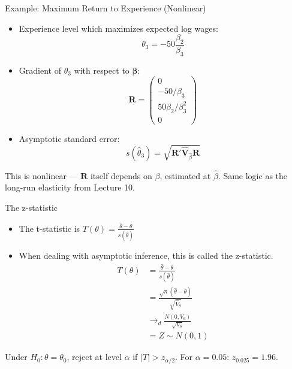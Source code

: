 \documentclass[aspectratio=169, handout, t]{beamer}
\numberwithin{equation}{section}
\begin{document}
\begin{frame}{Example: Maximum Return to Experience (Nonlinear)}
\begin{itemize}
\item Experience level which maximizes expected log wages:
\[
\theta_3 = -50\frac{\beta_2}{\beta_3}
\]
\item Gradient of $\theta_3$ with respect to $\bm{\beta}$:
\[
\bm{R} =
\begin{pmatrix}
0 \\
-50/\beta_3 \\
50\beta_2/\beta_3^2 \\
0
\end{pmatrix}
\]
\item Asymptotic standard error:
\[
s(\hat{\theta}_3) = \sqrt{\bm{R}' \bm{\hat{V}}_{\hat{\beta}} \bm{R}}
\]
\end{itemize}

This is nonlinear --- $\bm{R}$ itself depends on $\beta$, estimated at $\hat\beta$. Same logic as the long-run elasticity from Lecture 10.

\end{frame}


\begin{frame}{The z-statistic}
\begin{itemize}
\item The t-statistic is $T(\theta)=\frac{\hat{\theta}-\theta}{s(\hat{\theta})}$
\item When dealing with asymptotic inference, this is called the z-statistic.
\begin{align*}
T(\theta)&=\frac{\hat{\theta}-\theta}{s(\hat{\theta})}\\
&=\frac{\sqrt{n}(\hat{\theta}-\theta)}{\sqrt{\hat{V}_\theta}}\\
&\rightarrow_d \frac{N(0,V_\theta)}{\sqrt{V_\theta}}\\
&=Z\sim N(0,1)
\end{align*}
\end{itemize}

\pause

Under $H_0: \theta = \theta_0$, reject at level $\alpha$ if $|T| > z_{\alpha/2}$. For $\alpha = 0.05$: $z_{0.025} = 1.96$.

\end{frame}

\end{document}

